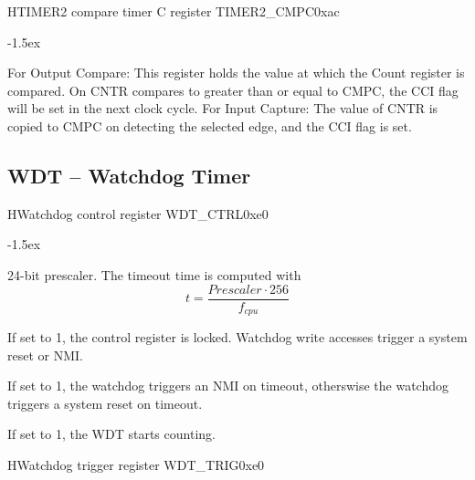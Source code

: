 \documentclass[12pt]{article}
\begin{document}
\begin{register}{H}{TIMER2 compare timer C register TIMER2\_CMPC}{0xac}
\label{timer2cmpc}
%
\regnewline%
\end{register}
\begin{regdesc}[0.8\textwidth]\begin{reglist}[00000]
\itemsep-1.5ex
\item[CMPC] For Output Compare: This register holds the value at which the Count register is compared. On CNTR compares to greater than or equal to CMPC, the CCI flag will be set in the next clock cycle. For Input Capture: The value of CNTR is copied to CMPC on detecting the selected edge, and the CCI flag is set.
\end{reglist}\end{regdesc}


\subsection{WDT -- Watchdog Timer}
\begin{register}{H}{Watchdog control register WDT\_CTRL}{0xe0}
\label{wdtctrl}
%
%
%
%
%
\regnewline%
\end{register}
\begin{regdesc}[0.8\textwidth]\begin{reglist}[00000]
\itemsep-1.5ex
\item [Prescaler] 24-bit prescaler. The timeout time is computed with
\begin{equation*}
t = \dfrac{Prescaler \cdot 256}{f_{cpu}}
\end{equation*}
\item [LOCK] If set to 1, the control register is locked. Watchdog write accesses trigger a system reset or NMI.
\item [NMI] If set to 1, the watchdog triggers an NMI on timeout, otherswise the watchdog triggers a system reset on timeout.
\item [EN] If set to 1, the WDT starts counting.
\end{reglist}\end{regdesc}

\begin{register}{H}{Watchdog trigger register WDT\_TRIG}{0xe0}
\label{wdttrig}
%
\regnewline%
\end{register}
\end{document}
